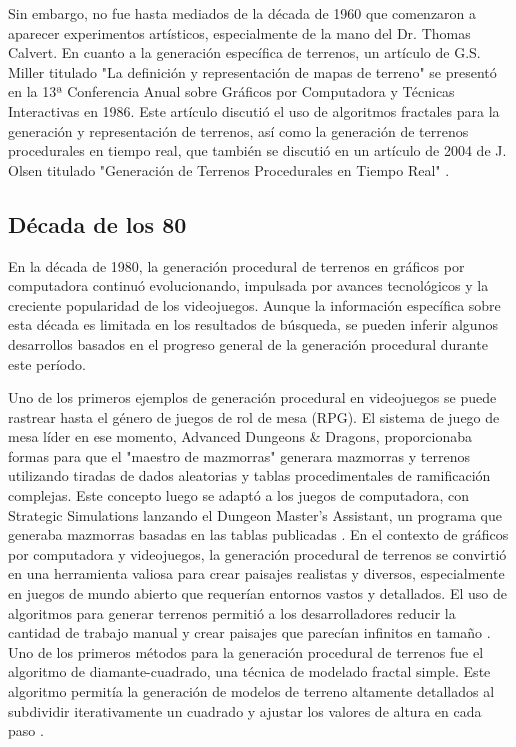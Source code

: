 Sin embargo, no fue hasta mediados de la década de 1960 que comenzaron a aparecer experimentos artísticos, especialmente de la mano del Dr. Thomas Calvert. En cuanto a la generación específica de terrenos, un artículo de G.S. Miller titulado "La definición y representación de mapas de terreno" se presentó en la 13ª Conferencia Anual sobre Gráficos por Computadora y Técnicas Interactivas en 1986. Este artículo discutió el uso de algoritmos fractales para la generación y representación de terrenos, así como la generación de terrenos procedurales en tiempo real, que también se discutió en un artículo de 2004 de J. Olsen titulado "Generación de Terrenos Procedurales en Tiempo Real" \cite{SurveyProceduralWorlds}.

\subsection{Década de los 80}

En la década de 1980, la generación procedural de terrenos en gráficos por computadora continuó evolucionando, impulsada por avances tecnológicos y la creciente popularidad de los videojuegos. Aunque la información específica sobre esta década es limitada en los resultados de búsqueda, se pueden inferir algunos desarrollos basados en el progreso general de la generación procedural durante este período.

Uno de los primeros ejemplos de generación procedural en videojuegos se puede rastrear hasta el género de juegos de rol de mesa (RPG). El sistema de juego de mesa líder en ese momento, Advanced Dungeons \& Dragons, proporcionaba formas para que el "maestro de mazmorras" generara mazmorras y terrenos utilizando tiradas de dados aleatorias y tablas procedimentales de ramificación complejas. Este concepto luego se adaptó a los juegos de computadora, con Strategic Simulations lanzando el Dungeon Master's Assistant, un programa que generaba mazmorras basadas en las tablas publicadas \cite{SurveyProceduralWorlds}. En el contexto de gráficos por computadora y videojuegos, la generación procedural de terrenos se convirtió en una herramienta valiosa para crear paisajes realistas y diversos, especialmente en juegos de mundo abierto que requerían entornos vastos y detallados. El uso de algoritmos para generar terrenos permitió a los desarrolladores reducir la cantidad de trabajo manual y crear paisajes que parecían infinitos en tamaño \cite{ProceduralWorlds}. Uno de los primeros métodos para la generación procedural de terrenos fue el algoritmo de diamante-cuadrado, una técnica de modelado fractal simple. Este algoritmo permitía la generación de modelos de terreno altamente detallados al subdividir iterativamente un cuadrado y ajustar los valores de altura en cada paso \cite{ComputerGraphics}.

